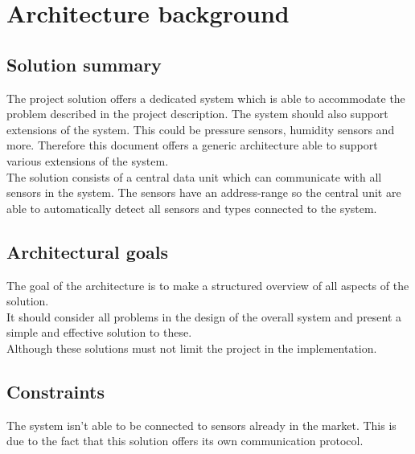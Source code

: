 \chapter{Architecture background}

\section{Solution summary}
The project solution offers a dedicated system which is able to accommodate the problem described in the project description. The system should also support extensions of the system. This could be pressure sensors, humidity sensors and more. Therefore this document offers a generic architecture able to support various extensions of the system.\\
The solution consists of a central data unit which can communicate with all sensors in the system. The sensors have an address-range so the central unit are able to automatically detect all sensors and types connected to the system. 

\section{Architectural goals}
The goal of the architecture is to make a structured overview of all aspects of the solution.\\
It should consider all problems in the design of the overall system and present a simple and effective solution to these.\\
Although these solutions must not limit the project in the  implementation.\\

\section{Constraints}
The system isn't able to be connected to sensors already in the market. This is due to the fact that this solution offers its own communication protocol.\\
